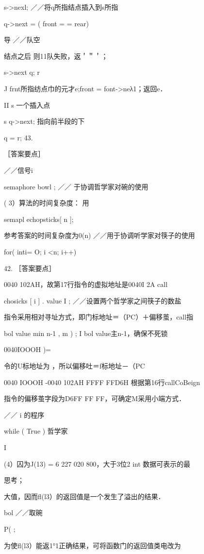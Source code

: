 {{    s->nexl;   ／／将q所指结点插入到s所指

    q->next =    ( front = = rear)

    导    ／／队空

    结点之后    则11队失败，返＇＂＇；

    s->next   q;    r

    J frnt所指纺点巾的元才e;front = font->neλ1；返回e．

    II s    一个插入点

    s   q->next;     指向前半段的下

    q = r;    43.

    ［答案要点］

    ／／信号i

    semaphore bowl ;    ／／   于协调哲学家对碗的使用

   ( 3）算法的时间复杂度：    用

    semapl  echopsticks[ n ];

   参考答案的时间复杂度为0(n)    ／／用于协调听学家对筷子的使用

    for( inti= O; i <n; i++)

42. ［答案要点］

    0040 102AH，故第17行指令的虚拟地址是0040I 2A   call

    chosicks [ i  ] . value   I ;   ／／设置两个哲学家之间筷子的数盐

    指令采用相对寻址方式，即门标地址＝（PC）＋偏移茧，call指

   bol value   min  n-1 ,  m ) ;    I  bol value主n-1，确保不死锁

    0040IOOOH    )=

    令的U标地址为    ，所以偏移吐＝f标地址－（PC

    0040 IOOOH -0040 102AH   FFFF FFD6H   根据第16行callCoBeign

    指令的偏移茧字段为D6FF FF FF，可确定M采用小端方式．

    ／／    i 的程序

  while ( True )    哲学家

    I

    (4）囚为J(13) = 6 227 020 800，大于3位2  int 数据可表示的最

    思考；

    大值，因而fl(l3）的返回值是一个发生了溢出的结果．

    bol    ／／取碗

    P(     ;

    为使fl(l3）能返1°1正确结果，可将函数门的返回值类电改为

}}
